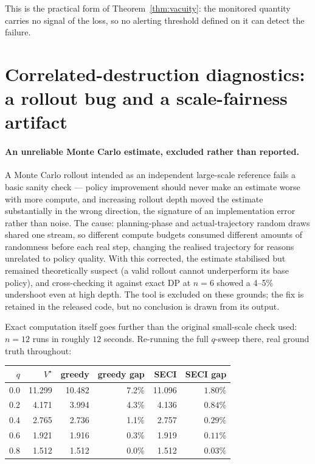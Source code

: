 This is the practical form of Theorem~\ref{thm:vacuity}: the monitored quantity
carries no signal of the loss, so no alerting threshold defined on it can detect
the failure.

\section{Correlated-destruction diagnostics: a rollout bug and a scale-fairness artifact}
\label{sec:appendix-mc}

\paragraph{An unreliable Monte Carlo estimate, excluded rather than reported.}
A Monte Carlo rollout intended as an independent large-scale reference
fails a basic sanity check --- policy improvement should never make an
estimate worse with more compute, and increasing rollout depth moved the
estimate substantially in the wrong direction, the signature of an
implementation error rather than noise. The cause: planning-phase and
actual-trajectory random draws shared one stream, so different compute
budgets consumed different amounts of randomness before each real step,
changing the realised trajectory for reasons unrelated to policy quality. With
this corrected, the estimate stabilised but remained theoretically suspect (a
valid rollout cannot underperform its base policy), and cross-checking it
against exact DP at $n=6$ showed a 4--5\% undershoot even at high depth. The
tool is excluded on these grounds; the fix is retained in the released code,
but no conclusion is drawn from its output.

Exact computation itself goes further than the original small-scale check used:
$n=12$ runs in roughly $12$ seconds. Re-running the full $q$-sweep there, real
ground truth throughout:

\begin{center}
\begin{tabular}{rrrrrr}
\toprule
$q$ & $V^\star$ & greedy & greedy gap & SECI & SECI gap \\
\midrule
0.0 & 11.299 & 10.482 & 7.2\% & 11.096 & $\mathbf{1.80\%}$ \\
0.2 & 4.171 & 3.994 & 4.3\% & 4.136 & $\mathbf{0.84\%}$ \\
0.4 & 2.765 & 2.736 & 1.1\% & 2.757 & $\mathbf{0.29\%}$ \\
0.6 & 1.921 & 1.916 & 0.3\% & 1.919 & $\mathbf{0.11\%}$ \\
0.8 & 1.512 & 1.512 & 0.0\% & 1.512 & $\mathbf{0.03\%}$ \\
\bottomrule
\end{tabular}
\end{center}

